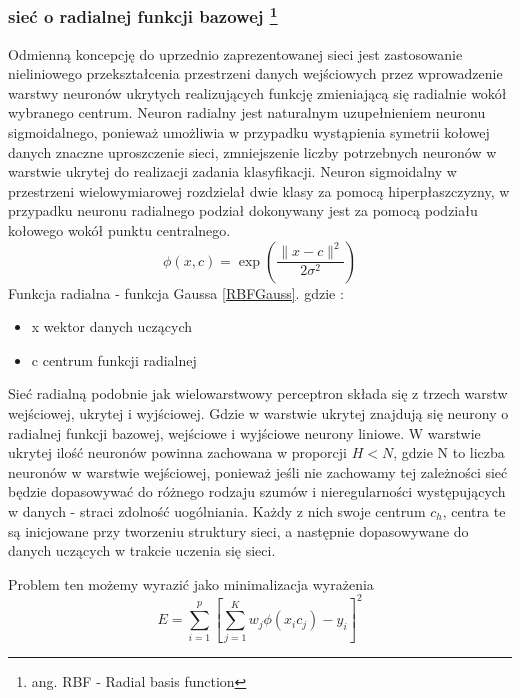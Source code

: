 \documentclass{classrep}
\begin{document}
\subsubsection{sieć o radialnej funkcji bazowej \footnote{ang. RBF - Radial basis function}}
\label{RBF}

Odmienną koncepcję do uprzednio zaprezentowanej sieci jest zastosowanie nieliniowego przekształcenia przestrzeni danych wejściowych przez wprowadzenie warstwy neuronów ukrytych realizujących funkcję zmieniającą się radialnie wokół wybranego centrum. Neuron radialny jest naturalnym uzupełnieniem neuronu sigmoidalnego, ponieważ umożliwia w przypadku wystąpienia symetrii kołowej danych znaczne uproszczenie sieci, zmniejszenie liczby potrzebnych neuronów w warstwie ukrytej do realizacji zadania klasyfikacji. Neuron sigmoidalny w przestrzeni wielowymiarowej rozdzielał dwie klasy za pomocą hiperpłaszczyzny, w przypadku neuronu radialnego podział dokonywany jest za pomocą podziału kołowego wokół punktu centralnego.
\begin{equation}
\phi (x,c) = \exp \left( \frac{\| x-c \| ^{2}}{2 \sigma ^{2}} \right)
\label{RBFGauss}
\end{equation}
Funkcja radialna - funkcja Gaussa \ref{RBFGauss}.
gdzie :
\begin{itemize}
\item x wektor danych uczących
\item c centrum funkcji radialnej
\end{itemize}

Sieć radialną podobnie jak wielowarstwowy perceptron składa się z trzech warstw wejściowej, ukrytej i wyjściowej. Gdzie w warstwie ukrytej znajdują się neurony o radialnej funkcji bazowej, wejściowe i wyjściowe neurony liniowe. W warstwie ukrytej ilość neuronów powinna zachowana w proporcji $H < N$, gdzie N to liczba neuronów w warstwie wejściowej, ponieważ jeśli nie zachowamy tej zależności sieć będzie dopasowywać do różnego rodzaju szumów i nieregularności występujących w danych - straci zdolność uogólniania. Każdy z nich swoje centrum $c_{h}$, centra te są inicjowane przy tworzeniu struktury sieci, a następnie dopasowywane do danych uczących w trakcie uczenia się sieci.

Problem ten możemy wyrazić jako minimalizacja wyrażenia 
\begin{equation}
E = \sum \limits ^{p} _{i=1} \left[ \sum \limits ^{K} _{j=1} w_j \phi ( x_i c_j) -y_i  \right] ^{2}
\end{equation}
\end{document}
